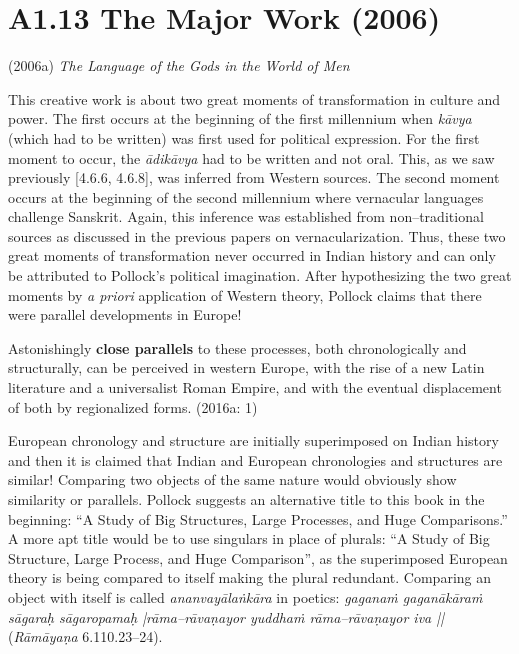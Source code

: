 \section*{A1.13 The Major Work (2006)}

(2006a)\textit{ The Language of the Gods in the World of Men}

This creative work is about two great moments of transformation in culture and power. The first occurs at the beginning of the first millennium when \textit{kāvya }(which had to be written) was first used for political expression. For the first moment to occur, the\textit{ ādikāvya }had to be written and not oral. This, as we saw previously [4.6.6, 4.6.8], was inferred from Western sources. The second moment occurs at the beginning of the second millennium where vernacular languages challenge Sanskrit. Again, this inference was established from non–traditional sources as discussed in the previous papers on vernacularization. Thus, these two great moments of transformation never occurred in Indian history and can only be attributed to Pollock’s political imagination. After hypothesizing the two great moments by \textit{a priori} application of Western theory, Pollock claims that there were parallel developments in Europe!

\begin{myquote}
Astonishingly \textbf{close parallels} to these processes, both chronologically and structurally, can be perceived in western Europe, with the rise of a new Latin literature and a universalist Roman Empire, and with the eventual displacement of both by regionalized forms. (2016a: 1)
\end{myquote}

European chronology and structure are initially superimposed on Indian history and then it is claimed that Indian and European chronologies and structures are similar! Comparing two objects of the same nature would obviously show similarity or parallels. Pollock suggests an alternative title to this book in the beginning: “A Study of Big Structures, Large Processes, and Huge Comparisons.” A more apt title would be to use singulars in place of plurals: “A Study of Big Structure, Large Process, and Huge Comparison”, as the superimposed European theory is being compared to itself making the plural redundant. Comparing an object with itself is called \textit{ananvayālaṅkāra} in poetics: \textit{gaganaṁ gaganākāraṁ sāgaraḥ sāgaropamaḥ |rāma–rāvaṇayor yuddhaṁ rāma–rāvaṇayor iva || }(\textit{Rāmāyaṇa} 6.110.23–24).

